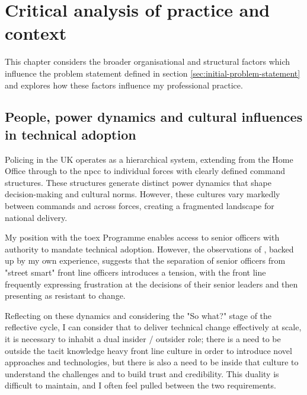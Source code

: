 \documentclass[12pt,a4paper,oneside]{report}
\begin{document}
\chapter{Critical analysis of practice and context} 
\label{ch:critical-analysis-of-practice-and-context}
This chapter considers the broader organisational and structural factors which influence the problem statement defined in section \ref{sec:initial-problem-statement} and explores how these factors influence my professional practice.

\section{People, power dynamics and cultural influences in technical adoption} 
\label{sec:people-power-dynamics-and-cultural-influences-in-technical-adoption}
Policing in the UK operates as a hierarchical system, extending from the Home Office through to the \gls{npcc} to individual forces with clearly defined command structures.  These structures generate distinct power dynamics that shape decision-making and cultural norms. However, these cultures vary markedly between commands and across forces, creating a fragmented landscape for national delivery.

My position with the \gls{toex} Programme enables access to senior officers with authority to mandate technical adoption.  However, the observations of \citet{gundhus2013experience}, backed up by my own experience, suggests that the separation of senior officers from "street smart" front line officers introduces a tension, with the front line frequently expressing frustration at the decisions of their senior leaders and then presenting as resistant to change.

Reflecting on these dynamics and considering the "So what?" stage of the reflective cycle, I can consider that to deliver technical change effectively at scale, it is necessary to inhabit a dual insider / outsider role; there is a need to be outside the tacit knowledge heavy front line culture in order to introduce novel approaches and technologies, but there is also a need to be inside that culture to understand the challenges and to build trust and credibility.  This duality is difficult to maintain, and I often feel pulled between the two requirements.
\end{document}
